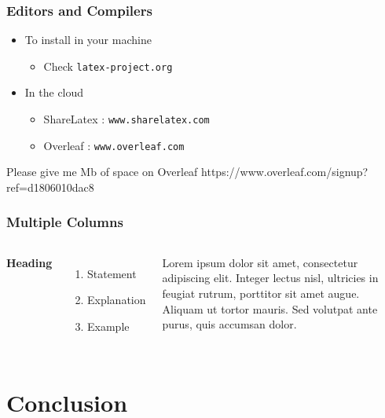 \documentclass{beamer}
\begin{document}
\begin{frame}
\frametitle{Editors and Compilers}
\begin{itemize}
\item To install in your machine
\begin{itemize}
\item Check \texttt{latex-project.org}
\end{itemize}
\item In the cloud
\begin{itemize}
\item ShareLatex : \texttt{www.sharelatex.com}
\item Overleaf : \texttt{www.overleaf.com}
\end{itemize}
\end{itemize}
\vskip 1cm
\begin{block}{Please give me Mb of space on Overleaf}
https://www.overleaf.com/signup?ref=d1806010dac8
\end{block}
\end{frame}


\begin{frame}
\frametitle{Multiple Columns}
\begin{columns}[c]
\textbf{Heading}
\begin{enumerate}
\item Statement
\item Explanation
\item Example
\end{enumerate}
Lorem ipsum dolor sit amet, consectetur adipiscing elit. Integer lectus nisl, ultricies in feugiat rutrum, porttitor sit amet augue. Aliquam ut tortor mauris. Sed volutpat ante purus, quis accumsan dolor.
\end{columns}
\end{frame}



\section{Conclusion}
\end{document}
